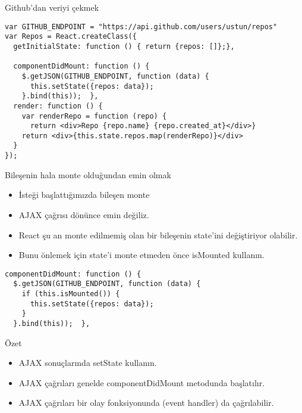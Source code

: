 \documentclass[presentation]{beamer}
\begin{document}
\begin{frame}[fragile,label=sec-5]{Github'dan veriyi çekmek}
 \begin{verbatim}
var GITHUB_ENDPOINT = "https://api.github.com/users/ustun/repos"
var Repos = React.createClass({
  getInitialState: function () { return {repos: []};},

  componentDidMount: function () {
    $.getJSON(GITHUB_ENDPOINT, function (data) {
      this.setState({repos: data});
    }.bind(this));  },
  render: function () {
    var renderRepo = function (repo) {
      return <div>Repo {repo.name} {repo.created_at}</div>}
    return <div>{this.state.repos.map(renderRepo)}</div>
  }
});
\end{verbatim}
\end{frame}

\begin{frame}[fragile,label=sec-6]{Bileşenin hala monte olduğundan emin olmak}
 \begin{itemize}
\item İsteği başlattığımızda bileşen monte
\item AJAX çağrısı dönünce emin değiliz.
\item React şu an monte edilmemiş olan bir bileşenin state'ini değiştiriyor olabilir.
\item Bunu önlemek için state'i monte etmeden önce isMounted kullanın.
\end{itemize}

\begin{verbatim}
componentDidMount: function () {
  $.getJSON(GITHUB_ENDPOINT, function (data) {
    if (this.isMounted()) {
      this.setState({repos: data});
    }
  }.bind(this));  },
\end{verbatim}
\end{frame}

\begin{frame}[label=sec-7]{Özet}
\begin{itemize}
\item AJAX sonuçlarında setState kullanın.
\item AJAX çağrıları genelde componentDidMount metodunda başlatılır.
\item AJAX çağrıları bir olay fonksiyonunda (event handler) da çağrılabilir.
\end{itemize}
\end{frame}
\end{document}
